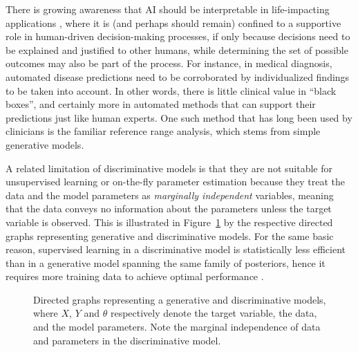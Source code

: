 \documentclass[english]{scrartcl}
\begin{document}
There is growing awareness that AI should be interpretable in life-impacting applications \cite{Molnar-18}, where it is (and perhaps should remain) confined to a supportive role in human-driven decision-making processes, if only because decisions need to be explained and justified to other humans, while determining the set of possible outcomes may also be part of the process. For instance, in medical diagnosis, automated disease predictions need to be corroborated by individualized findings to be taken into account. In other words, there is little clinical value in ``black boxes'', and certainly more in automated methods that can support their predictions just like human experts. One such method that has long been used by clinicians is the familiar reference range analysis, which stems from simple generative models.

A related limitation of discriminative models is that they are not suitable for unsupervised learning or on-the-fly parameter estimation because they treat the data and the model parameters as {\em marginally independent} variables, meaning that the data conveys no information about the parameters unless the target variable is observed. This is illustrated in Figure~\ref{fig:graph_comparison} by the respective directed graphs representing generative and discriminative models. For the same basic reason, supervised learning in a discriminative model is statistically less efficient than in a generative model spanning the same family of posteriors, hence it requires more training data to achieve optimal performance \cite{Ng-01}. 

\begin{figure}[!ht]
\begin{center}
\hspace*{.2\textwidth}
\caption{Directed graphs representing a generative and discriminative models, where $X$, $Y$ and $\theta$ respectively denote the target variable, the data, and the model parameters. Note the marginal independence of data and parameters in the discriminative model.}
\label{fig:graph_comparison}
\end{center}
\end{figure}
\end{document}
